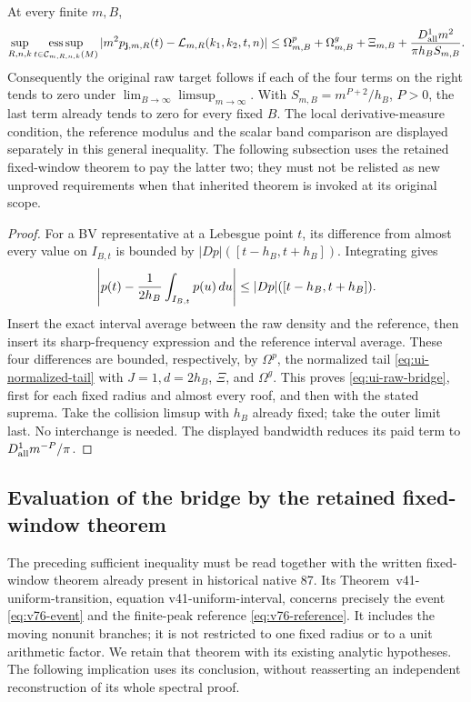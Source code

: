 \begin{proposition}
\label{prop:ui-raw-bridge}
At every finite $m,B$,
\begin{equation}\label{eq:ui-raw-bridge}
 \sup_{R,n,k}\operatorname*{ess\,sup}_{t\in\mathcal C_{m,R,n,k}(M)}
     |m^2p_{\mathbf j,m,R}(t)-\mathcal L_{m,R}(k_1,k_2,t,n)|
 \le\Omega_{m,B}^{p}+\Omega_{m,B}^{g}+\Xi_{m,B}
               +{D_{\rm all}^{1}m^2\over\pi h_BS_{m,B}}.
\end{equation}
Consequently the original raw target follows if each of the four
terms on the right tends to zero under
$\lim_{B\to\infty}\limsup_{m\to\infty}$.  With
$S_{m,B}=m^{P+2}/h_B$, $P>0$, the last term already tends to zero
for every fixed $B$.  The local derivative-measure condition,
the reference modulus and the scalar band comparison are displayed
separately in this general inequality. The following subsection
uses the retained fixed-window theorem to pay the latter two;
they must not be relisted as new unproved requirements when that
inherited theorem is invoked at its original scope.
\end{proposition}
\begin{proof}
For a BV representative at a Lebesgue point $t$, its difference
from almost every value on $I_{B,t}$ is bounded by
$|Dp|([t-h_B,t+h_B])$.  Integrating gives
\[
 \left|p(t)-{1\over2h_B}\int_{I_{B,t}}p(u)\,du\right|
       \le |Dp|([t-h_B,t+h_B]).
\]
Insert the exact interval average between the raw density and the
reference, then insert its sharp-frequency expression and the
reference interval average.  These four differences are bounded,
respectively, by $\Omega^p$, the normalized tail
\eqref{eq:ui-normalized-tail} with $J=1,d=2h_B$, $\Xi$, and
$\Omega^g$.  This proves \eqref{eq:ui-raw-bridge}, first for each
fixed radius and almost every roof, and then with the stated suprema.
Take the collision limsup with $h_B$ already fixed; take the outer
limit last.  No interchange is needed.  The displayed bandwidth
reduces its paid term to $D_{\rm all}^1m^{-P}/\pi$.
\end{proof}

\subsection{Evaluation of the bridge by the retained fixed-window theorem}

The preceding sufficient inequality must be read together with the
written fixed-window theorem already present in historical native 87.
Its Theorem~\textup{v41-uniform-transition}, equation
\textup{v41-uniform-interval}, concerns precisely the event
\eqref{eq:v76-event} and the finite-peak reference
\eqref{eq:v76-reference}. It includes the moving nonunit branches;
it is not restricted to one fixed radius or to a unit arithmetic
factor. We retain that theorem with its existing analytic hypotheses.
The following implication uses its conclusion, without reasserting an
independent reconstruction of its whole spectral proof.

